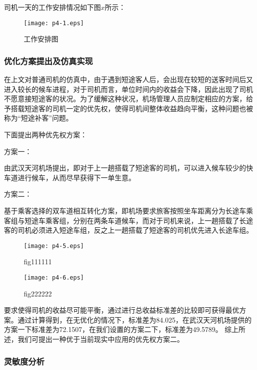 \documentclass[withoutpreface,bwprint]{cumcmthesis} %
\begin{document}
司机一天的工作安排情况如下图$x$所示：

 \begin{figure}[H]
  	\centering
	\texttt{[image: p4-1.eps]}
  	\caption{工作安排图}
  \end{figure}

\subsubsection{优化方案提出及仿真实现}
在上文对普通司机的仿真中，由于遇到短途客人后，会出现在较短的送客时间后又进入较长的候车进程，对于司机而言，单位时间内的收益会下降，因此出现了司机不愿意接短途客的状况。为了缓解这种状况，机场管理人员应制定相应的方案，给予搭载短途客的司机一定的优先权，使得司机间整体收益趋向平衡，这种问题也被称为“短途补客”问题。

下面提出两种优先权方案：

方案一：

由武汉天河机场提出，即对于上一趟搭载了短途客的司机，可以进入候车较少的快车道进行候车，从而尽早获得下一单生意。

方案二：

基于乘客选择的双车道相互转化方案，即机场要求旅客按照坐车距离分为长途车乘客组与短途车乘客组，分别在两条车道候车，而对于司机来说，上一趟搭载了长途客的司机必须进入短途车组，反之上一趟搭载了短途客的司机优先进入长途车组。



	\begin{figure}[htbp]
		\begin{minipage}[t]{0.45\linewidth}
			\centering
			\texttt{[image: p4-5.eps]}
			\caption{fig111111}
		\end{minipage}%
		\begin{minipage}[t]{0.45\linewidth}
			\centering
			\texttt{[image: p4-6.eps]}
			\caption{fig222222}
		\end{minipage}
	\end{figure}



要求使得司机的收益尽可能平衡，通过进行总收益标准差的比较即可获得最优方案。通过计算得到，在无优化的情况下，标准差为84.025，在武汉天河机场提供的方案一下标准差为72.1507，在我们设置的方案二下，标准差为49.5789。
综上所述，我们可提出一种优于当前现实中应用的优先权方案二。

\subsubsection{灵敏度分析}
\end{document}
